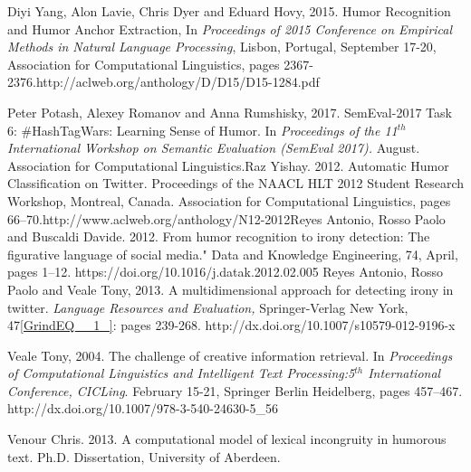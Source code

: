 \documentclass{article} %
\begin{document}
\noindent Diyi Yang, Alon Lavie, Chris Dyer and Eduard Hovy, 2015. Humor Recognition and Humor Anchor Extraction, In \textit{Proceedings of 2015 Conference on Empirical Methods in Natural Language Processing}, Lisbon, Portugal, September 17-20, Association for Computational Linguistics, pages 2367-2376.http://aclweb.org/anthology/D/D15/D15-1284.pdf

\noindent Peter Potash, Alexey Romanov and Anna Rumshisky, 2017. SemEval-2017 Task 6: \#HashTagWars: Learning Sense of Humor. In \textit{Proceedings of the 11${}^{th}$ International Workshop on Semantic Evaluation (SemEval 2017). }August. Association for Computational Linguistics.Raz Yishay. 2012. Automatic Humor Classification on Twitter. Proceedings of the NAACL HLT 2012 Student Research Workshop, Montreal, Canada. Association for Computational Linguistics, pages 66--70.http://www.aclweb.org/anthology/N12-2012Reyes  Antonio, Rosso Paolo and Buscaldi  Davide. 2012. From humor recognition to irony detection: The figurative language of social media." Data and Knowledge Engineering, 74, April, pages 1--12. https://doi.org/10.1016/j.datak.2012.02.005 Reyes  Antonio, Rosso Paolo and Veale Tony, 2013. A multidimensional approach for detecting irony in twitter. \textit{Language Resources and Evaluation, }Springer-Verlag New York, 47\eqref{GrindEQ__1_}: pages 239-268.  http://dx.doi.org/10.1007/s10579-012-9196-x

\noindent Veale Tony, 2004. The challenge of creative information retrieval. In \textit{Proceedings of Computational Linguistics and Intelligent Text Processing:5${}^{th}$ International Conference, CICLing}. February 15-21, Springer Berlin Heidelberg, pages 457--467. http://dx.doi.org/10.1007/978-3-540-24630-5\_56

\noindent Venour Chris. 2013. A computational model of lexical incongruity in humorous text. Ph.D. Dissertation, University of Aberdeen.

\noindent 

\noindent 

\noindent 

\noindent  

\noindent 
\end{document}
